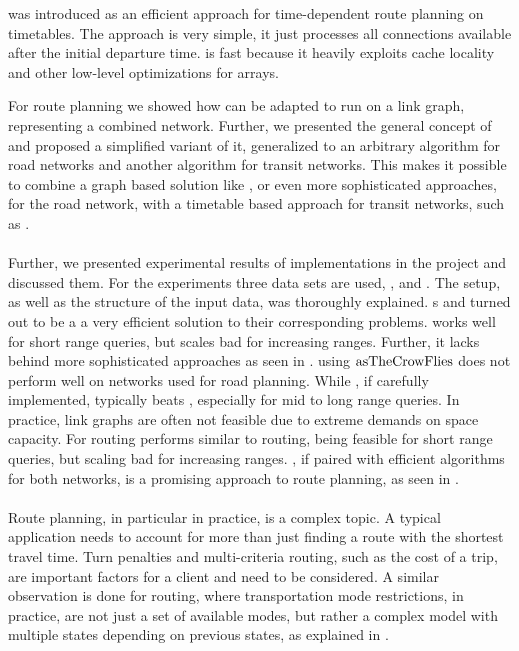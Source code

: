 	\csa was introduced as an efficient approach for time-dependent route planning on timetables. The approach is very simple, it just processes all connections
	available after the initial departure time. \csa is fast because it heavily exploits cache locality  and other low-level optimizations
	for arrays.
	
	For \multiModal route planning we showed how \dijkstra can be adapted to run on a link graph, representing a combined network. Further, we presented the
	general concept of \anr and proposed a simplified variant of it, generalized to an arbitrary algorithm for road networks and another algorithm for transit
	networks. This makes it possible to combine a graph based solution like \dijkstra, or even more sophisticated approaches, for the road network,
	with a timetable based approach for transit networks, such as \csa.\\\\
	Further, we presented experimental results of implementations in the \cobweb project  and discussed them.
	For the experiments three data sets are used, \freiburgR, \stuttgartR and \switzerlandR.
	The setup, as well as the structure of the input data, was thoroughly explained. {\coverTree}s and \csa turned out to be a a very
	efficient solution to their corresponding problems. \dijkstra works well for short range queries,
	but scales bad for increasing ranges. Further, it lacks behind more sophisticated approaches as seen in .
	\astar using $\operatorname{asTheCrowFlies}$ does not perform well on networks used for road planning. While \alt, if carefully implemented, typically beats \dijkstra,
	especially for mid to long range queries. In practice, link graphs are often not feasible due to extreme demands on space capacity. For \multiModal routing
	\dijkstra performs similar to \uniModal routing, being feasible for short range queries, but scaling bad for increasing ranges. \anr, if paired with efficient algorithms
	for both networks, is a promising approach to \multiModal route planning, as seen in .\\\\
	Route planning, in particular in practice, is a complex topic. A typical application needs to account for more than just finding a route with the shortest travel time.
	Turn penalties and multi-criteria routing, such as the cost of a trip, are important factors for a client and need to be considered. A similar observation is done
	for \multiModal routing, where transportation mode restrictions, in practice, are not just a set of available modes, but rather a complex model with
	multiple states depending on previous states, as explained in .
	
